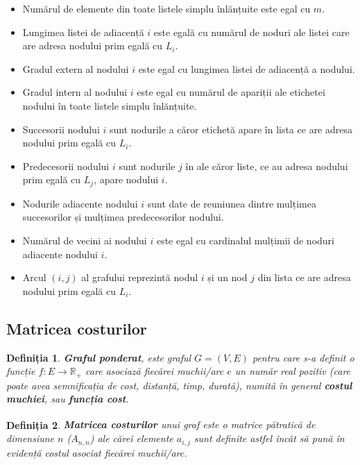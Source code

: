 \documentclass[9pt,a4paper]{report}
\newtheorem{definitie}{Definiția}
\begin{document}
\begin{itemize}
    \item Numărul de elemente din toate listele simplu înlănțuite este egal cu $m$.
    \item Lungimea listei de adiacență $i$ este egală cu numărul de noduri ale listei care are adresa nodului prim egală cu $L_i$.
    \item Gradul extern al nodului $i$ este egal cu lungimea listei de adiacență a nodului.
    \item Gradul intern al nodului $i$ este egal cu numărul de apariții ale etichetei nodului în toate listele simplu înlănțuite.
    \item Succesorii nodului $i$ sunt nodurile a căror etichetă apare în lista ce are adresa nodului prim egală cu $L_i$.
    \item Predecesorii nodului $i$ sunt nodurile $j$ în ale căror liste, ce au adresa nodului prim egală cu $L_j$, apare nodului $i$.
    \item Nodurile adiacente nodului $i$ sunt date de reuniunea dintre mulțimea succesorilor și mulțimea predecesorilor nodului.
    \item Numărul de vecini ai nodului $i$ este egal cu cardinalul mulțimii de noduri adiacente nodului $i$.
    \item Arcul $(i,j)$ al grafului reprezintă nodul $i$ și un nod $j$ din lista ce are adresa nodului prim egală cu $L_i$.
\end{itemize}

\subsection{Matricea costurilor}

\begin{definitie}
    \textbf{Graful ponderat}, este graful $G=(V, E)$ pentru care s-a definit o funcție $f : E \rightarrow \mathbb{R}_+$ care asociază fiecărei muchii/arc $e$ un număr real pozitiv (care poate avea semnificația de cost, distanță, timp, durată), numită în general \textbf{costul muchiei}, sau \textbf{funcția cost}.
\end{definitie}

\begin{definitie}
    \textbf{Matricea costurilor}\textsuperscript{\cite{milosescu}} unui graf este o matrice pătratică de dimensiune $n$ ($A_{n,n}$) ale cărei elemente $a_{i,j}$ sunt definite astfel încât să pună în evidență costul asociat fiecărei muchii/arc.
\end{definitie}
\end{document}
